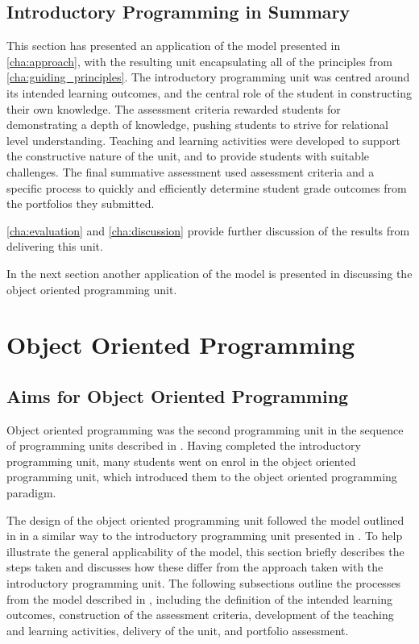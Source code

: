 \subsection{Introductory Programming in Summary} %
\label{sub:intro_summary}

This section has presented an application of the model presented in \cref{cha:approach}, with the resulting unit encapsulating all of the principles from \cref{cha:guiding_principles}. The introductory programming unit was centred around its intended learning outcomes, and the central role of the student in constructing their own knowledge. The assessment criteria rewarded students for demonstrating a depth of knowledge, pushing students to strive for relational level understanding. Teaching and learning activities were developed to support the constructive nature of the unit, and to provide students with suitable challenges. The final summative assessment used assessment criteria and a specific process to quickly and efficiently determine student grade outcomes from the portfolios they submitted. 

\cref{cha:evaluation} and \cref{cha:discussion} provide further discussion of the results from delivering this unit.

In the next section another application of the model is presented in discussing the object oriented programming unit.


\clearpage
\section{Object Oriented Programming} %
\label{sec:object_oriented_programming}



\subsection{Aims for Object Oriented Programming} %
\label{sub:aims_for_object_oriented_programming}

Object oriented programming was the second programming unit in the sequence of programming units described in . Having completed the introductory programming unit, many students went on enrol in the object oriented programming unit, which introduced them to the object oriented programming paradigm. 

The design of the object oriented programming unit followed the model outlined in  in a similar way to the introductory programming unit presented in . To help illustrate the general applicability of the model, this section briefly describes the steps taken and discusses how these differ from the approach taken with the introductory programming unit. The following subsections outline the processes from the model described in , including the definition of the intended learning outcomes, construction of the assessment criteria, development of the teaching and learning activities, delivery of the unit, and portfolio assessment.

